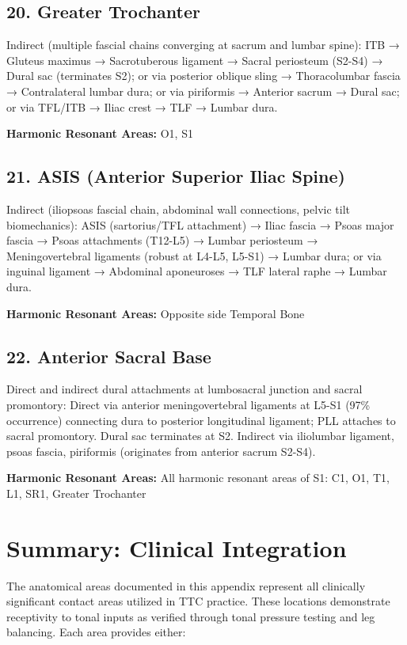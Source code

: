 \documentclass[11pt,letterpaper]{article}
\begin{document}
\subsection{20. Greater Trochanter}

Indirect (multiple fascial chains converging at sacrum and lumbar spine): ITB → Gluteus maximus → Sacrotuberous ligament → Sacral periosteum (S2-S4) → Dural sac (terminates S2); or via posterior oblique sling → Thoracolumbar fascia → Contralateral lumbar dura; or via piriformis → Anterior sacrum → Dural sac; or via TFL/ITB → Iliac crest → TLF → Lumbar dura.


\textbf{Harmonic Resonant Areas:} O1, S1


\subsection{21. ASIS (Anterior Superior Iliac Spine)}

Indirect (iliopsoas fascial chain, abdominal wall connections, pelvic tilt biomechanics): ASIS (sartorius/TFL attachment) → Iliac fascia → Psoas major fascia → Psoas attachments (T12-L5) → Lumbar periosteum → Meningovertebral ligaments (robust at L4-L5, L5-S1) → Lumbar dura; or via inguinal ligament → Abdominal aponeuroses → TLF lateral raphe → Lumbar dura.


\textbf{Harmonic Resonant Areas:} Opposite side Temporal Bone


\subsection{22. Anterior Sacral Base}

Direct and indirect dural attachments at lumbosacral junction and sacral promontory: Direct via anterior meningovertebral ligaments at L5-S1 (97\% occurrence) connecting dura to posterior longitudinal ligament; PLL attaches to sacral promontory. Dural sac terminates at S2. Indirect via iliolumbar ligament, psoas fascia, piriformis (originates from anterior sacrum S2-S4).


\textbf{Harmonic Resonant Areas:} All harmonic resonant areas of S1: C1, O1, T1, L1, SR1, Greater Trochanter


\section{Summary: Clinical Integration}

The anatomical areas documented in this appendix represent all clinically significant contact areas utilized in TTC practice. These locations demonstrate receptivity to tonal inputs as verified through tonal pressure testing and leg balancing. Each area provides either:
\end{document}

